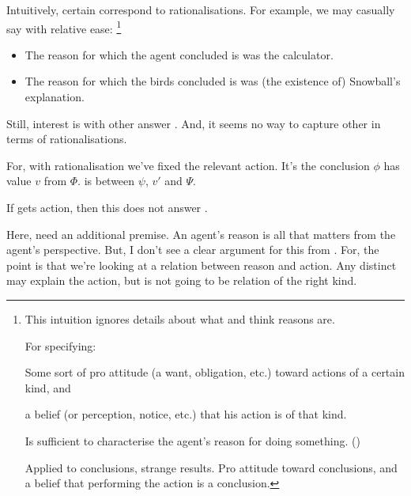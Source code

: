 \begin{note}
  Intuitively, certain \ros{} correspond to rationalisations.
  For example, we may casually say with relative ease:%
  \footnote{
    This intuition ignores details about what \citeauthor{Davidson:1963aa} and \citeauthor{Hieronymi:2011aa} think reasons are.

    For \citeauthor{Davidson:1963aa} specifying:
    \begin{enumerate*}[label=(\alph*), ref=(\alph*)]
    \item
      Some sort of pro attitude (a want, obligation, etc.) toward actions of a certain kind, and
    \item
      a belief (or perception, notice, etc.) that his action is of that kind.
    \end{enumerate*}
    Is sufficient to characterise the agent's reason for doing something.
    (\citeyear[Cf.][685,686]{Davidson:1963aa})

    Applied to conclusions, strange results.
    Pro attitude toward conclusions, and a belief that performing the action is a conclusion.
  }

  \begin{itemize}[noitemsep]
  \item
    The reason for which the agent concluded \propM{\gistCalcEq{}} is  was the calculator.
  \item
    The reason for which the birds concluded  is  was (the existence of) Snowball's explanation.
  \end{itemize}
  Still, interest is with other  answer \qWhy{}.
  And, it seems no way to capture other  in terms of rationalisations.

  For, with rationalisation we've fixed the relevant action.
  It's the conclusion \(\phi\) has value \(v\) from \(\Phi\).
  \ros{} is between \(\psi\), \(v'\) and \(\Psi\).

  If \ros{} gets action, then this does not answer \qWhy{}.

  Here, need an additional premise.
  An agent's reason is all that matters from the agent's perspective.
  But, I don't see a clear argument for this from \citeauthor{Davidson:1963aa}.
  For, the point is that we're looking at a relation between reason and action.
  Any distinct \ros{} may explain the action, but is not going to be relation of the right kind.
\end{note}

